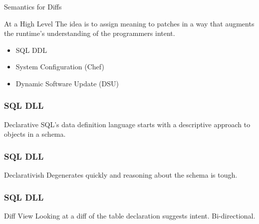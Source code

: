 \documentclass{beamer}
\begin{document}
\begin{frame}{Semantics for Diffs}
  \begin{block}{At a High Level}
    The idea is to assign meaning to patches in a way that augments the runtime's understanding of the programmers intent.

    \begin{itemize}
      \item SQL DDL
      \item System Configuration (Chef)
      \item Dynamic Software Update (DSU)
    \end{itemize}
  \end{block}
\end{frame}

\begin{frame}[fragile]
  \frametitle{SQL DLL}
  \begin{block}{Declarative}
    SQL's data definition language starts with a descriptive approach to objects in a schema.
  \end{block}

  \begin{example}
    
  \end{example}
\end{frame}

\begin{frame}[fragile]
  \frametitle{SQL DLL}
  \begin{block}{Declarativish}
    Degenerates quickly and reasoning about the schema is tough.
  \end{block}

  \begin{example}
    
  \end{example}
\end{frame}

\begin{frame}[fragile]
  \frametitle{SQL DLL}
  \begin{block}{Diff View}
    Looking at a diff of the table declaration suggests intent. Bi-directional.
  \end{block}

  \begin{example}
    \begin{center}
      \begin{minipage}{.44\textwidth}
        
      \end{minipage}
      \hfill
      \begin{minipage}{.48\textwidth}
        
      \end{minipage}
    \end{center}
  \end{example}
\end{frame}
\end{document}
